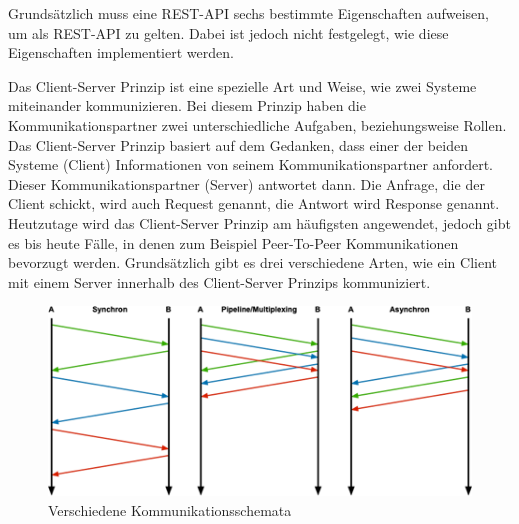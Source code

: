 
Grundsätzlich muss eine REST-API sechs bestimmte Eigenschaften aufweisen, um als REST-API zu gelten. Dabei ist jedoch nicht festgelegt, wie diese Eigenschaften implementiert werden. \cite{RedHatRest}


Das Client-Server Prinzip ist eine spezielle Art und Weise, wie zwei Systeme miteinander kommunizieren. Bei diesem Prinzip haben die Kommunikationspartner zwei unterschiedliche Aufgaben, beziehungsweise Rollen. Das Client-Server Prinzip basiert auf dem Gedanken, dass einer der beiden Systeme (Client) Informationen von seinem Kommunikationspartner anfordert. Dieser Kommunikationspartner (Server) antwortet dann. Die Anfrage, die der Client schickt, wird auch Request genannt, die Antwort wird Response genannt. Heutzutage wird das Client-Server Prinzip am häufigsten angewendet, jedoch gibt es bis heute Fälle, in denen zum Beispiel Peer-To-Peer Kommunikationen bevorzugt werden. Grundsätzlich gibt es drei verschiedene Arten, wie ein Client mit einem Server innerhalb des Client-Server Prinzips kommuniziert. 

\begin{figure}[H]
    \centering
    \includegraphics{media/REST/ClientServer.png}
    \caption{Verschiedene Kommunikationsschemata \cite{ClientServer}}
\end{figure}

